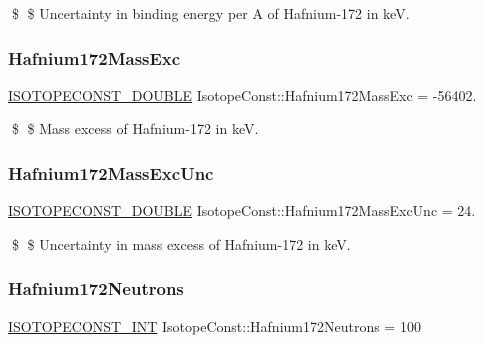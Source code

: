 \$ \$ Uncertainty in binding energy per A of Hafnium-\/172 in keV. \mbox{\label{group___isotope_const-_hafnium-_hf172_gae9d18a68e1c70de92ec844d584ab4b22}} 
\subsubsection{\texorpdfstring{Hafnium172\+Mass\+Exc}{Hafnium172MassExc}}
{\footnotesize\ttfamily \mbox{\hyperlink{group___isotope_const-_macros_ga8f45a7272ce02c0b4c65c44636ed719a}{I\+S\+O\+T\+O\+P\+E\+C\+O\+N\+S\+T\+\_\+\+D\+O\+U\+B\+LE}} Isotope\+Const\+::\+Hafnium172\+Mass\+Exc = -\/56402.}

\$ \$ Mass excess of Hafnium-\/172 in keV. \mbox{\label{group___isotope_const-_hafnium-_hf172_ga103949e9edcc9d82cd8426c2d838128a}} 
\subsubsection{\texorpdfstring{Hafnium172\+Mass\+Exc\+Unc}{Hafnium172MassExcUnc}}
{\footnotesize\ttfamily \mbox{\hyperlink{group___isotope_const-_macros_ga8f45a7272ce02c0b4c65c44636ed719a}{I\+S\+O\+T\+O\+P\+E\+C\+O\+N\+S\+T\+\_\+\+D\+O\+U\+B\+LE}} Isotope\+Const\+::\+Hafnium172\+Mass\+Exc\+Unc = 24.}

\$ \$ Uncertainty in mass excess of Hafnium-\/172 in keV. \mbox{\label{group___isotope_const-_hafnium-_hf172_gabb339a0e3b4dcfd22d3f10616cba09d9}} 
\subsubsection{\texorpdfstring{Hafnium172\+Neutrons}{Hafnium172Neutrons}}
{\footnotesize\ttfamily \mbox{\hyperlink{group___isotope_const-_macros_ga5f18360b3e99483a35c32d789e62621c}{I\+S\+O\+T\+O\+P\+E\+C\+O\+N\+S\+T\+\_\+\+I\+NT}} Isotope\+Const\+::\+Hafnium172\+Neutrons = 100}


